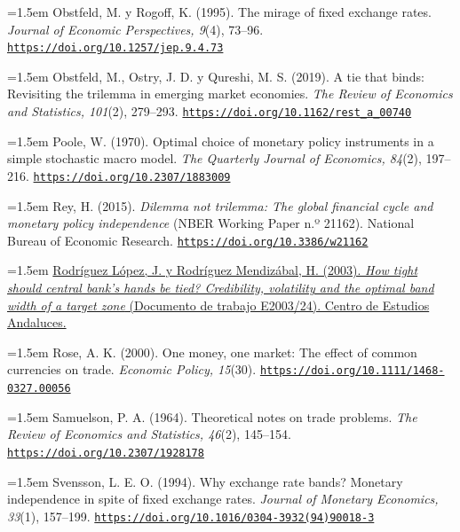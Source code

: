 \documentclass[10pt,a4paper]{article}
\begin{document}
\noindent\hangindent=1.5em Obstfeld, M. y Rogoff, K. (1995). The mirage of fixed exchange rates. \textit{Journal of Economic Perspectives, 9}(4), 73--96. \href{https://doi.org/10.1257/jep.9.4.73}{\nolinkurl{https://doi.org/10.1257/jep.9.4.73}}

\noindent\hangindent=1.5em Obstfeld, M., Ostry, J. D. y Qureshi, M. S. (2019). A tie that binds: Revisiting the trilemma in emerging market economies. \textit{The Review of Economics and Statistics, 101}(2), 279--293. \href{https://doi.org/10.1162/rest_a_00740}{\nolinkurl{https://doi.org/10.1162/rest_a_00740}}

\noindent\hangindent=1.5em Poole, W. (1970). Optimal choice of monetary policy instruments in a simple stochastic macro model. \textit{The Quarterly Journal of Economics, 84}(2), 197--216. \href{https://doi.org/10.2307/1883009}{\nolinkurl{https://doi.org/10.2307/1883009}}

\noindent\hangindent=1.5em Rey, H. (2015). \textit{Dilemma not trilemma: The global financial cycle and monetary policy independence} (NBER Working Paper n.º 21162). National Bureau of Economic Research. \href{https://doi.org/10.3386/w21162}{\nolinkurl{https://doi.org/10.3386/w21162}}

\noindent\hangindent=1.5em \href{https://www.centrodeestudiosandaluces.es/publicaciones/how-tight-should-central-banks-hands-be-tied-credibilityvolatility-and-the-optimal-band-width-of-a-target-zone}{Rodríguez López, J. y Rodríguez Mendizábal, H. (2003). \textit{How tight should central bank's hands be tied? Credibility, volatility and the optimal band width of a target zone} (Documento de trabajo E2003/24). Centro de Estudios Andaluces.}

\noindent\hangindent=1.5em Rose, A. K. (2000). One money, one market: The effect of common currencies on trade. \textit{Economic Policy, 15}(30). \href{https://doi.org/10.1111/1468-0327.00056}{\nolinkurl{https://doi.org/10.1111/1468-0327.00056}}

\noindent\hangindent=1.5em Samuelson, P. A. (1964). Theoretical notes on trade problems. \textit{The Review of Economics and Statistics, 46}(2), 145--154. \href{https://doi.org/10.2307/1928178}{\nolinkurl{https://doi.org/10.2307/1928178}}

\noindent\hangindent=1.5em Svensson, L. E. O. (1994). Why exchange rate bands? Monetary independence in spite of fixed exchange rates. \textit{Journal of Monetary Economics, 33}(1), 157--199. \href{https://doi.org/10.1016/0304-3932(94)90018-3}{\nolinkurl{https://doi.org/10.1016/0304-3932(94)90018-3}}
\end{document}
